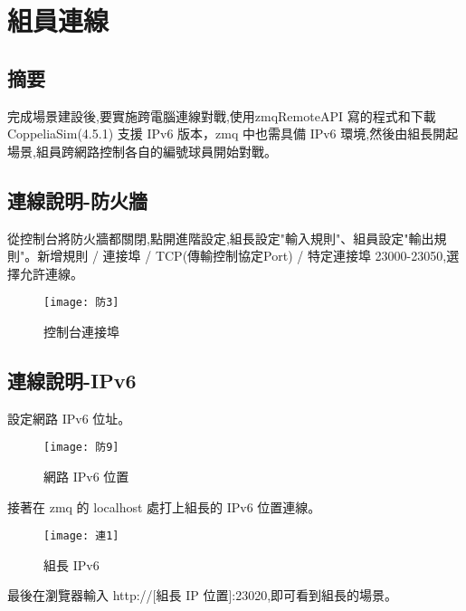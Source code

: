 \chapter{組員連線}
\renewcommand{\baselinestretch}{10.0} %
\setcounter{page}{21}  %
\fontsize{14pt}{2.5pt}\sectionef
\section{摘要}
  完成場景建設後,要實施跨電腦連線對戰,使用zmqRemoteAPI 寫的程式和下載 CoppeliaSim(4.5.1) 支援 IPv6 版本，zmq 中也需具備 IPv6 環境,然後由組長開起場景,組員跨網路控制各自的編號球員開始對戰。\\
\section{連線說明-防火牆}
  從控制台將防火牆都關閉,點開進階設定,組長設定"輸入規則"、組員設定"輸出規則"。新增規則 / 連接埠 / TCP(傳輸控制協定Port) / 特定連接埠 23000-23050,選擇允許連線。\\
\begin{figure}[hbt!]
\begin{center}
\texttt{[image: 防3]}
\caption{\Large 控制台連接埠}\label{防3}
\end{center}
\end{figure}
\section{連線說明-IPv6}
  設定網路 IPv6 位址。\\
\begin{figure}[hbt!]
\begin{center}
\texttt{[image: 防9]}
\caption{\Large 網路 IPv6 位置}\label{防9}
\end{center}
\end{figure}

  接著在 zmq 的 localhost 處打上組長的 IPv6 位置連線。\\
\newpage
\begin{figure}[hbt!]
\begin{center}
\texttt{[image: 連1]}
\caption{\Large 組長 IPv6 }\label{連1}
\end{center}
\end{figure}
  最後在瀏覽器輸入 http://[組長 IP 位置]:23020,即可看到組長的場景。